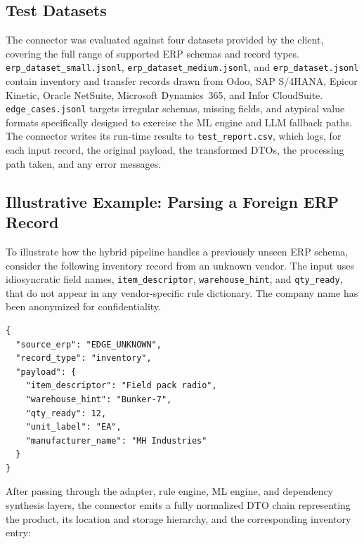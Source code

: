 \documentclass{article}
\begin{document}
\subsection{Test Datasets}
The connector was evaluated against four datasets provided by the client, covering the full
range of supported ERP schemas and record types.
\texttt{erp\_dataset\_small.jsonl}, \texttt{erp\_dataset\_medium.jsonl}, and
\texttt{erp\_dataset.jsonl} contain inventory and transfer records drawn from Odoo, SAP
S/4HANA, Epicor Kinetic, Oracle NetSuite, Microsoft Dynamics~365, and Infor CloudSuite.
\texttt{edge\_cases.jsonl} targets irregular schemas, missing fields, and atypical value
formats specifically designed to exercise the ML engine and LLM fallback paths.
The connector writes its run-time results to \texttt{test\_report.csv}, which logs, for each
input record, the original payload, the transformed DTOs, the processing path taken, and any
error messages.

\subsection{Illustrative Example: Parsing a Foreign ERP Record}
To illustrate how the hybrid pipeline handles a previously unseen ERP schema, consider the
following inventory record from an unknown vendor.
The input uses idiosyncratic field names, \texttt{item\_descriptor},
\texttt{warehouse\_hint}, and \texttt{qty\_ready}, that do not appear in any vendor-specific
rule dictionary.
The company name has been anonymized for confidentiality.

\begin{verbatim}
{
  "source_erp": "EDGE_UNKNOWN",
  "record_type": "inventory",
  "payload": {
    "item_descriptor": "Field pack radio",
    "warehouse_hint": "Bunker-7",
    "qty_ready": 12,
    "unit_label": "EA",
    "manufacturer_name": "MH Industries"
  }
}
\end{verbatim}

After passing through the adapter, rule engine, ML engine, and dependency synthesis layers,
the connector emits a fully normalized DTO chain representing the product, its location and
storage hierarchy, and the corresponding inventory entry:
\end{document}
